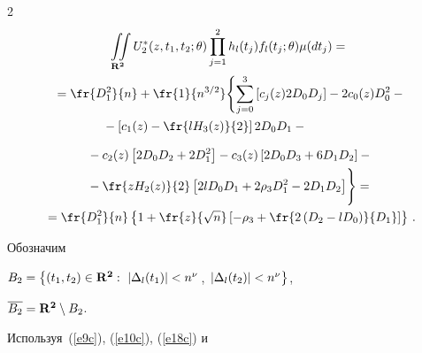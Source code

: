 \begin{multicols}{2}
\begin{multline*}
\iint\limits_{\bf R^2} U_2^*(z,t_1,t_2;\theta)


      \prod_{j=1}^2 h_l(t_j) f_l(t_j;\theta) \mu(dt_j)={}


\\


{} =\fr{D_1^2}{n}+\fr{1}{n^{3/2}}


      \Biggl\{ \sum_{j=0}^3 \left[c_j(z) 2D_0D_j \right]-


      2c_0(z)D_0^2-{}\\


      {}- \left[c_1(z)-\fr{lH_3(z)}{2} \right]


       2D_0D_1-\hspace*{40pt}


{}


      \end{multline*}


      


      


  \noindent


      \begin{multline}


{} -c_2(z) \left[2D_0D_2+2D_1^2 \right]-


      c_3(z) \left[2D_0D_3+6D_1D_2 \right]-


   {}\\


{} -\fr{zH_2(z)}{2} \left[2lD_0D_1+2\rho_3D_1^2-2D_1 D_2 \right]


      \Biggr\}={}\\


      {}=\fr{D_1^2}{n}\left\{1+


      \fr{z}{\sqrt{n}} \left[-\rho_3+


      \fr{2\left(D_2-lD_0 \right)}{D_1} \right] \right\}\,.


   \label{e18c}


\end{multline}


   Обозначим


   $B_2=\left\{\left(t_1,t_2\right)\in {\bf R^2}:~


    \left|\Delta_l(t_1)\right|<n^\nu\right.$, $\left.\left|\Delta_l(t_2)\right|<n^\nu 


    \vphantom{\bf R^2}\right\}$,


$\overline{B_2}={\bf R^2}\setminus B_2$.


    Используя~(\ref{e9c}), (\ref{e10c}), (\ref{e18c}) и 



\end{multicols}
